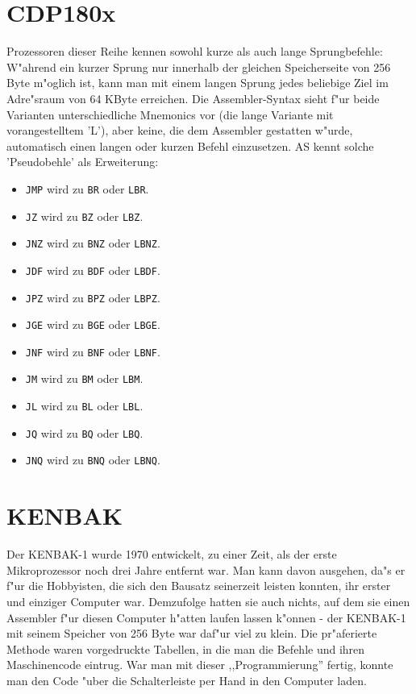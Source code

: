 \documentclass[12pt,a4paper,twoside]{report}
\newcommand{\tty}[1]{{\tt #1}}
\newcommand{\asname}{AS}
\begin{document}
\section{CDP180x}

Prozessoren dieser Reihe kennen sowohl kurze als auch lange Sprungbefehle:
W"ahrend ein kurzer Sprung nur innerhalb der gleichen Speicherseite von 256 Byte
m"oglich ist, kann man mit einem langen Sprung jedes beliebige Ziel im
Adre"sraum von 64 KByte erreichen.  Die Assembler-Syntax sieht f"ur beide
Varianten unterschiedliche Mnemonics vor (die lange Variante mit vorangestelltem
'L'), aber keine, die dem Assembler gestatten w"urde, automatisch einen langen
oder kurzen Befehl einzusetzen.  \asname{} kennt solche 'Pseudobehle' als Erweiterung:
\begin{itemize}
\item{\tty{JMP} wird zu \tty{BR} oder \tty{LBR}.}
\item{\tty{JZ} wird zu \tty{BZ} oder \tty{LBZ}.}
\item{\tty{JNZ} wird zu \tty{BNZ} oder \tty{LBNZ}.}
\item{\tty{JDF} wird zu \tty{BDF} oder \tty{LBDF}.}
\item{\tty{JPZ} wird zu \tty{BPZ} oder \tty{LBPZ}.}
\item{\tty{JGE} wird zu \tty{BGE} oder \tty{LBGE}.}
\item{\tty{JNF} wird zu \tty{BNF} oder \tty{LBNF}.}
\item{\tty{JM} wird zu \tty{BM} oder \tty{LBM}.}
\item{\tty{JL} wird zu \tty{BL} oder \tty{LBL}.}
\item{\tty{JQ} wird zu \tty{BQ} oder \tty{LBQ}.}
\item{\tty{JNQ} wird zu \tty{BNQ} oder \tty{LBNQ}.}
\end{itemize}


\section{KENBAK}

Der KENBAK-1 wurde 1970 entwickelt, zu einer Zeit, als der erste
Mikroprozessor noch drei Jahre entfernt war.  Man kann davon ausgehen, da"s
er f"ur die Hobbyisten, die sich den Bausatz seinerzeit leisten konnten, ihr
erster und einziger Computer war.  Demzufolge hatten sie auch nichts, auf
dem sie einen Assembler f"ur diesen Computer h"atten laufen lassen k"onnen -
der KENBAK-1 mit seinem Speicher von 256 Byte war daf"ur viel zu klein.  Die
pr"aferierte Methode waren vorgedruckte Tabellen, in die man die Befehle und
ihren Maschinencode eintrug.  War man mit dieser ,,Programmierung'' fertig,
konnte man den Code "uber die Schalterleiste per Hand in den Computer laden.
\end{document}
